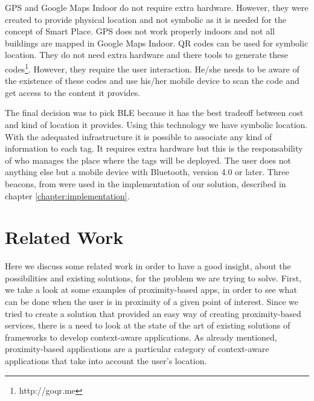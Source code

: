 

\gls{GPS} and Google Maps Indoor do not require extra hardware. However, they were created to provide physical location and not symbolic as it is needed for the concept of Smart Place.
\gls{GPS} does not work properly indoors and not all buildings are mapped in Google Maps Indoor.
\gls{QR} codes can be used for symbolic location. They do not need extra hardware and there tools to generate these codes\footnote{http://goqr.me}.
However, they require the user interaction. He/she needs to be aware of the existence of these codes and use his/her mobile device to scan the code and get access to the content it provides.

The final decision was to pick \gls{BLE} because it has the best tradeoff between cost and kind of location it provides. Using this technology we have symbolic location. With the adequated infrastructure it is possible to associate any kind of information to each tag.
It requires extra hardware but this is the responsability of who manages the place where the tags will be deployed.
The user does not anything else but a mobile device with Bluetooth, version 4.0 or later.
Three beacons, from  were used in the implementation of our solution, described in chapter \ref{chapter:implementation}.

\section{Related Work}
\label{sec:background_related_work}
Here we discuss some related work in order to have a good insight, about the possibilities and existing solutions, for the problem we are trying to solve.
First, we take a look at some examples of proximity-based apps, in order to see what can be done when the user is in proximity of a given point of interest.
Since we tried to create a solution that provided an easy way of creating proximity-based services, there is a need to look at the state of the art of existing solutions of frameworks to develop context-aware applications. As already mentioned, proximity-based applications are a particular category of context-aware applications that take into account the user's location.


